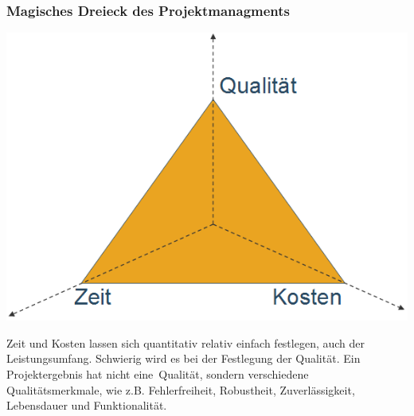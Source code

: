 \subsubsection{Magisches Dreieck des Projektmanagments}

\includegraphics[scale=0.4]{pictures/lf02-pic/lf02-projekt-dreieck.png}

Zeit und Kosten lassen sich quantitativ relativ einfach festlegen, auch der Leistungsumfang. Schwierig wird es bei der Festlegung der Qualität. Ein Projektergebnis hat nicht \ql eine\qr\ Qualität, sondern verschiedene Qualitätsmerkmale, wie z.B. Fehlerfreiheit, Robustheit, Zuverlässigkeit, Lebensdauer und Funktionalität.

